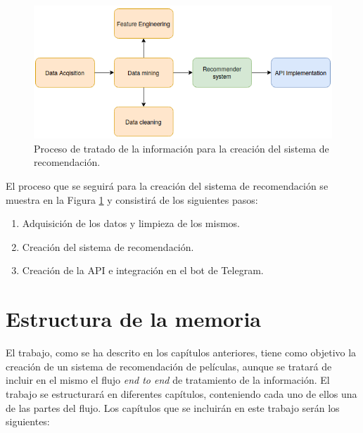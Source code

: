 \begin{figure}[h]
    \centering
    \captionsetup{width=10cm}
    \includegraphics[width=12cm]{contenido/imagenes/initial.png}
    \caption{Proceso de tratado de la información para la creación del sistema de recomendación.}
    \label{fig:process}
\end{figure}

El proceso que se seguirá para la creación del sistema de recomendación se muestra en la Figura \ref{fig:process} y consistirá de los siguientes pasos:
\begin{enumerate}
    \item Adquisición de los datos y limpieza de los mismos.
    \item Creación del sistema de recomendación.
    \item Creación de la API e integración en el bot de Telegram.
\end{enumerate}


\section{Estructura de la memoria}\label{sec:estructura}

El trabajo, como se ha descrito en los capítulos anteriores, tiene como objetivo la creación de un sistema de recomendación de películas, aunque se tratará de incluir en el mismo el flujo \textit{end to end} de tratamiento de la información. El trabajo se estructurará en diferentes capítulos, conteniendo cada uno de ellos una de las partes del flujo. Los capítulos que se incluirán en este trabajo serán los siguientes:

